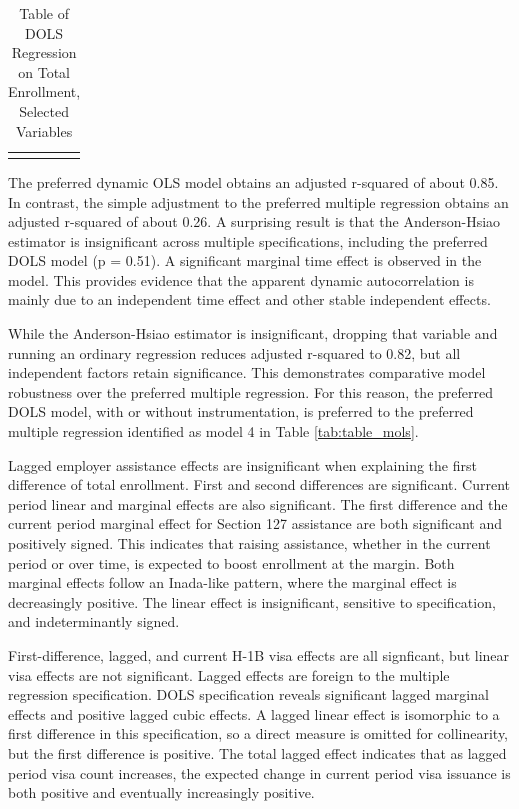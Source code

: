 \documentclass[review]{elsarticle}
\begin{document}
    \begin{table}
        \caption{Table of DOLS Regression on Total Enrollment, Selected Variables}
        \begin{tabularx}{\textwidth}{X}
            \centering
            
        \end{tabularx}
        \label{tab:table_dols}
        \end{table}

    The preferred dynamic OLS model obtains an adjusted r-squared of about 0.85.
    In contrast, the simple adjustment to the preferred multiple regression
    obtains an adjusted r-squared of about 0.26.
    A surprising result is that the Anderson-Hsiao estimator is insignificant
    across multiple specifications, including the preferred DOLS model (p = 0.51).
    A significant marginal time effect is observed in the model.
    This provides evidence that the apparent dynamic autocorrelation is
    mainly due to an independent time effect and other stable independent effects.
    
    While the Anderson-Hsiao estimator is insignificant,
    dropping that variable and running an ordinary regression reduces adjusted r-squared to 0.82,
    but all independent factors retain significance.
    This demonstrates comparative model robustness over the preferred multiple regression.
    For this reason, the preferred DOLS model, with or without instrumentation,
    is preferred to the preferred multiple regression identified as
    model 4 in Table \ref{tab:table_mols}.

    Lagged employer assistance effects are insignificant when explaining the first difference of total enrollment.
    First and second differences are significant.
    Current period linear and marginal effects are also significant.
    The first difference and the current period marginal effect for
    Section 127 assistance are both significant and positively signed.
    This indicates that raising assistance,
    whether in the current period or over time,
    is expected to boost enrollment at the margin.
    Both marginal effects follow an Inada-like pattern, where the marginal effect is decreasingly positive.
    The linear effect is insignificant, sensitive to specification, and indeterminantly signed.

    First-difference, lagged, and current H-1B visa effects are all signficant,
    but linear visa effects are not significant.
    Lagged effects are foreign to the multiple regression specification.
    DOLS specification reveals significant lagged marginal effects and positive
    lagged cubic effects.
    A lagged linear effect is isomorphic to a first difference in this specification,
    so a direct measure is omitted for collinearity,
    but the first difference is positive.
    The total lagged effect indicates that as lagged period visa count increases,
    the expected change in current period visa issuance is both positive and eventually increasingly positive.
\end{document}
